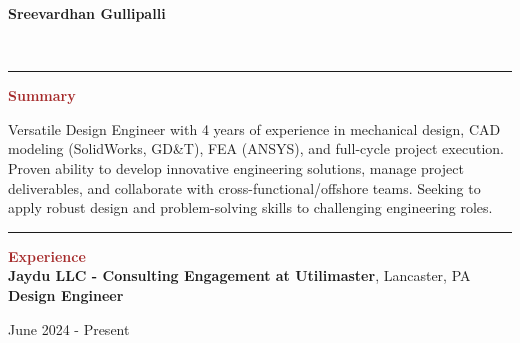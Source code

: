 \documentclass[11pt, letterpaper]{article}
\begin{document}
\begin{centering}
{\hfill{\huge \textbf{Sreevardhan Gullipalli}}\vspace{2pt}\hfill}
\end{centering}
\begin{flushleft}
%
\\ %
\end{flushleft}
\vspace{-8pt}
\noindent \rule[2pt]{\textwidth}{0.5pt} \vspace{-8mm}
\noindent \textbf{\large \textcolor{Brown}{Summary}}\vspace{2pt}\\
\begin{justify}
Versatile Design Engineer with 4 years of experience in mechanical design, CAD modeling (SolidWorks, GD\&T), FEA (ANSYS), and full-cycle project execution. Proven ability to develop innovative engineering solutions, manage project deliverables, and collaborate with cross-functional/offshore teams. Seeking to apply robust design and problem-solving skills to challenging engineering roles.
\end{justify}
\vspace{-8pt}
\noindent \rule[2pt]{\textwidth}{0.5pt}
\noindent \textbf{\large \textcolor{Brown}{Experience}}\vspace{4pt}\\
\textbf{Jaydu LLC - Consulting Engagement at Utilimaster}, Lancaster, PA\\
\textbf{Design Engineer}\hfill \raggedright{June 2024 - Present}\\ %
\end{document}

